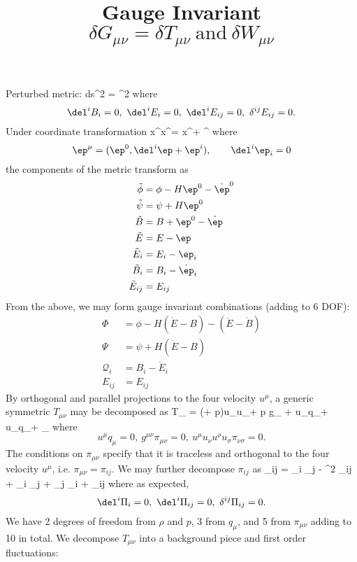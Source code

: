 \documentclass[10pt,letterpaper]{article}
\title{Gauge Invariant $\delta G_{\mu\nu} = \delta T_{\mu\nu}\ \text{and}\ \delta W_{\mu\nu}$}
\author{}
\date{}
\begin{document}
\maketitle 
\noindent Perturbed metric:
\be
	ds^2 = \Omega^2 
\ee
where
\[
	\del^i B_i = 0,\ \del^i E_i = 0,\ \del^i E_{ij} = 0,\ \delta^{ij}E_{ij} = 0.
\]
Under coordinate transformation
\be
	x^\mu \to \tilde x^\mu = x^\mu + \ep^\mu
\ee
where 
\[
	\ep^\mu = (\ep^0, \del^i \ep + \ep^i),\qquad \del^i \ep_i = 0
\]
the components of the metric transform as
\begin{align}
	\tilde \phi &= \phi - H \ep^0 - \dot \ep^0\\
	\tilde \psi &= \psi + H \ep^0\\
	\tilde B &=B + \ep^0 - \dot \ep\\
	\tilde E &= E-\ep \\
	\tilde E_{i}&= E_i - \ep_i\\
	\tilde B_i &= B_i - \dot \ep_i\\
	\tilde E_{ij} &= E_{ij}
\end{align}
From the above, we may form gauge invariant combinations (adding to 6 DOF):
\begin{align}
	\Phi &= \phi - H(\dot E - B) - (\ddot E - \dot B)\\
	\Psi &= \psi + H(\dot E-B)\\
	\mathcal Q_i &= B_i - \dot E_i\\
	E_{ij} &= E_{ij}
\end{align}
By orthogonal and parallel projections to the four velocity $u^\mu$, a generic symmetric $T_{\mu\nu}$ may be decomposed as
\be
	T_{\mu\nu} = (\rho + p)u_\mu u_\nu + p g_{\mu\nu} + u_\nu q_\mu + u_\mu q_\nu + \pi_{\mu\nu}
\ee
where
\[
	u^\mu q_\mu = 0,\ g^{\mu\nu} \pi_{\mu\nu} = 0, \ u^\mu u_\nu u^\rho u_\sigma \pi_{\nu\sigma} = 0.
\]
The conditions on $\pi_{\mu\nu}$ specify that it is traceless and orthogonal to the four velocity $u^\mu$, i.e. $\pi_{\mu\nu} = \pi_{ij}$. We may further decompose $\pi_{ij}$ as
\be
	\pi_{ij} = \del_i \del_j \Pi -  \del^2 \Pi \delta_{ij} +  \del_i \Pi_j +  \del_j \Pi_i + \Pi_{ij}
\ee
where as expected,
\[
	\del^i \Pi_i = 0,\  \del^i\Pi_{ij} = 0,\ \delta^{ij}\Pi_{ij} = 0.
\]
We have 2 degrees of freedom from $\rho$ and $p$, 3 from $q_\mu$, and 5 from $\pi_{\mu\nu}$ adding to 10 in total. We decompose $T_{\mu\nu}$ into a background piece and first order fluctuations:
\end{document}
